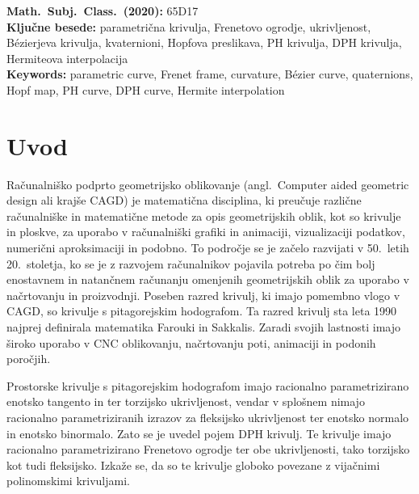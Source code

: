 \documentclass[12pt,a4paper,twoside]{article}
\newcommand{\kljucnebesede}{parametrična krivulja\sep Frenetovo ogrodje\sep ukrivljenost\sep Bézierjeva krivulja\sep kvaternioni\sep Hopfova preslikava\sep PH krivulja\sep DPH krivulja\sep Hermiteova interpolacija} %
\newcommand{\keywords}{parametric curve\sep Frenet frame\sep curvature\sep Bézier curve\sep quaternions\sep Hopf map\sep PH curve\sep DPH curve\sep Hermite interpolation} %
\newcommand{\sep}{, }  %
\theoremstyle{definition} %
\theoremstyle{plain} %
\theoremstyle{primerstyle}
\numberwithin{equation}{section}  %
\begin{document}
\vfill\noindent
\textbf{Math.~Subj.~Class.~(2020):} 65D17\\[1mm]%
\textbf{Ključne besede:} \kljucnebesede \\[1mm]
\textbf{Keywords:} \keywords

\cleardoublepage

\setcounter{page}{1}    %

\section{Uvod}
Računalniško podprto geometrijsko oblikovanje (angl.\ Computer aided geometric design ali krajše CAGD) je matematična disciplina, ki preučuje različne računalniške in matematične metode za opis geometrijskih oblik, kot so krivulje in ploskve, za uporabo v računalniški grafiki in animaciji, vizualizaciji podatkov, numerični aproksimaciji in podobno. To področje se je začelo razvijati v 50.\ letih 20.\ stoletja, ko se je z razvojem računalnikov pojavila potreba po čim bolj enostavnem in natančnem računanju omenjenih geometrijskih oblik za uporabo v načrtovanju in proizvodnji. Poseben razred krivulj, ki imajo pomembno vlogo v CAGD, so krivulje s pitagorejskim hodografom. Ta razred krivulj sta leta 1990 najprej definirala matematika Farouki in Sakkalis. Zaradi svojih lastnosti imajo široko uporabo v CNC oblikovanju, načrtovanju poti, animaciji in podonih poročjih.

Prostorske krivulje s pitagorejskim hodografom imajo racionalno parametrizirano enotsko tangento in ter torzijsko ukrivljenost, vendar v splošnem nimajo racionalno parametriziranih izrazov za fleksijsko ukrivljenost ter enotsko normalo in enotsko binormalo. Zato se je uvedel pojem DPH krivulj. Te krivulje imajo racionalno parametrizirano Frenetovo ogrodje ter obe ukrivljenosti, tako torzijsko kot tudi fleksijsko. Izkaže se, da so te krivulje globoko povezane z vijačnimi polinomskimi krivuljami.
\end{document}
